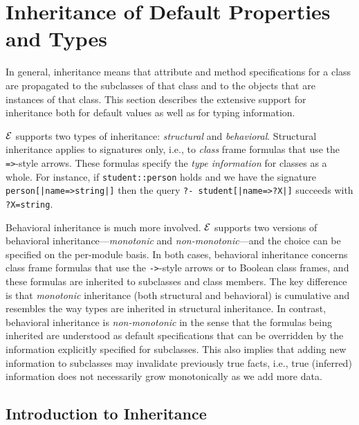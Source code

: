 \documentclass[11pt]{article}
\newcommand{\ERGO}{\mbox{\ensuremath{\cal{E}}\smaller{{\sc{RGO}}}}\xspace}
\newcommand{\FLSYSTEM}{\ERGO}
\begin{document}



\section{Inheritance of Default Properties and Types}\label{sec-inheritance}

In general, inheritance means that attribute and method specifications for
a class are propagated to the subclasses of that class and to the objects
that are instances of that class.
This section describes the extensive support for inheritance both for
default values as well as for typing information.

\FLSYSTEM supports two types of inheritance: \emph{structural} and
\emph{behavioral}.  Structural inheritance applies to signatures only,
i.e., to \emph{class} frame formulas that use the \texttt{=>}-style arrows.
These formulas specify the \emph{type information}   for classes as a whole.
For instance, if {\tt student::person} holds and we have the signature
\texttt{person[|name=>string|]} then the query {\tt ?- student[|name=>?X|]}
succeeds with {\tt ?X=string}.

Behavioral inheritance is much more involved.
\FLSYSTEM supports two versions of behavioral inheritance---\emph{monotonic}
and \emph{non-monotonic}---and the choice can be specified on the
per-module basis. In both cases, behavioral inheritance concerns
class frame formulas that use the \texttt{->}-style arrows or to Boolean class
frames, and these formulas are inherited to subclasses and class members.
The key difference is that \emph{monotonic} inheritance (both structural and
behavioral) is cumulative and
resembles the way types are inherited in structural inheritance.
In contrast, behavioral inheritance is \emph{non-monotonic} in the sense
that the formulas being inherited are understood as default specifications
that can be overridden by the information explicitly specified for subclasses.
This also implies that adding new information to subclasses may invalidate
previously true facts, i.e., true (inferred)
information does not necessarily grow monotonically  as we add more data.


\subsection{Introduction to Inheritance}
\end{document}
